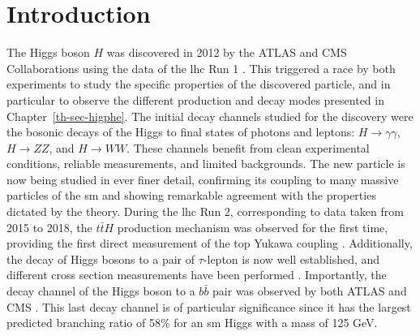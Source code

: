 \section{Introduction}
The Higgs boson $H$ \cite{Englert:1964et, PhysRevLett.13.508, Higgs:1964ia, PhysRevLett.13.585} was discovered in 2012 by the ATLAS and CMS Collaborations using the data of the \gls{lhc} Run 1 \cite{ATLAS:2012yve, CMS:2012qbp}. This triggered a race by both experiments to study the specific properties of the discovered particle, and in particular to observe the different production and decay modes presented in Chapter~\ref{th-sec-higphe}. The initial decay channels studied for the discovery were the bosonic decays of the Higgs to final states of photons and leptons: $H \rightarrow \gamma\gamma$, $H \rightarrow ZZ$, and $H \rightarrow WW$. These channels benefit from clean experimental conditions, reliable measurements, and limited backgrounds. The new particle is now being studied in ever finer detail, confirming its coupling to many massive particles of the \gls{sm} and showing remarkable agreement with the properties dictated by the theory. During the \gls{lhc} Run 2, corresponding to data taken from 2015 to 2018, the $t\bar{t}H$ production mechanism was observed for the first time, providing the first direct measurement of the top Yukawa coupling \cite{ATLAS:2018mme, CMS:2018uxb}. Additionally, the decay of Higgs bosons to a pair of $\tau$-lepton is now well established, and different cross section measurements have been performed \cite{atlasTauMeasu, CMS:2021gxc}. Importantly, the decay channel of the Higgs boson to a $b\bar{b}$ pair was observed by both ATLAS and CMS \cite{ATLAS:2018kot, CMS:2018nsn}. This last decay channel is of particular significance since it has the largest predicted branching ratio of 58\% for an \gls{sm} Higgs with a mass of 125 GeV. \\ 

